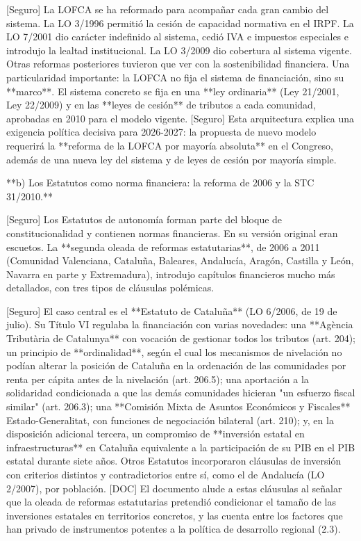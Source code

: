 \documentclass[10pt,a4paper]{article}
\begin{document}
[Seguro] La LOFCA se ha reformado para acompañar cada gran cambio del sistema. La LO 3/1996 permitió la cesión de capacidad normativa en el IRPF. La LO 7/2001 dio carácter indefinido al sistema, cedió IVA e impuestos especiales e introdujo la lealtad institucional. La LO 3/2009 dio cobertura al sistema vigente. Otras reformas posteriores tuvieron que ver con la sostenibilidad financiera. Una particularidad importante: la LOFCA no fija el sistema de financiación, sino su **marco**. El sistema concreto se fija en una **ley ordinaria** (Ley 21/2001, Ley 22/2009) y en las **leyes de cesión** de tributos a cada comunidad, aprobadas en 2010 para el modelo vigente. [Seguro] Esta arquitectura explica una exigencia política decisiva para 2026-2027: la propuesta de nuevo modelo requerirá la **reforma de la LOFCA por mayoría absoluta** en el Congreso, además de una nueva ley del sistema y de leyes de cesión por mayoría simple.

**b) Los Estatutos como norma financiera: la reforma de 2006 y la STC 31/2010.**

[Seguro] Los Estatutos de autonomía forman parte del bloque de constitucionalidad y contienen normas financieras. En su versión original eran escuetos. La **segunda oleada de reformas estatutarias**, de 2006 a 2011 (Comunidad Valenciana, Cataluña, Baleares, Andalucía, Aragón, Castilla y León, Navarra en parte y Extremadura), introdujo capítulos financieros mucho más detallados, con tres tipos de cláusulas polémicas.

[Seguro] El caso central es el **Estatuto de Cataluña** (LO 6/2006, de 19 de julio). Su Título VI regulaba la financiación con varias novedades: una **Agència Tributària de Catalunya** con vocación de gestionar todos los tributos (art. 204); un principio de **ordinalidad**, según el cual los mecanismos de nivelación no podían alterar la posición de Cataluña en la ordenación de las comunidades por renta per cápita antes de la nivelación (art. 206.5); una aportación a la solidaridad condicionada a que las demás comunidades hicieran "un esfuerzo fiscal similar" (art. 206.3); una **Comisión Mixta de Asuntos Económicos y Fiscales** Estado-Generalitat, con funciones de negociación bilateral (art. 210); y, en la disposición adicional tercera, un compromiso de **inversión estatal en infraestructuras** en Cataluña equivalente a la participación de su PIB en el PIB estatal durante siete años. Otros Estatutos incorporaron cláusulas de inversión con criterios distintos y contradictorios entre sí, como el de Andalucía (LO 2/2007), por población. [DOC] El documento alude a estas cláusulas al señalar que la oleada de reformas estatutarias pretendió condicionar el tamaño de las inversiones estatales en territorios concretos, y las cuenta entre los factores que han privado de instrumentos potentes a la política de desarrollo regional (2.3).
\end{document}
